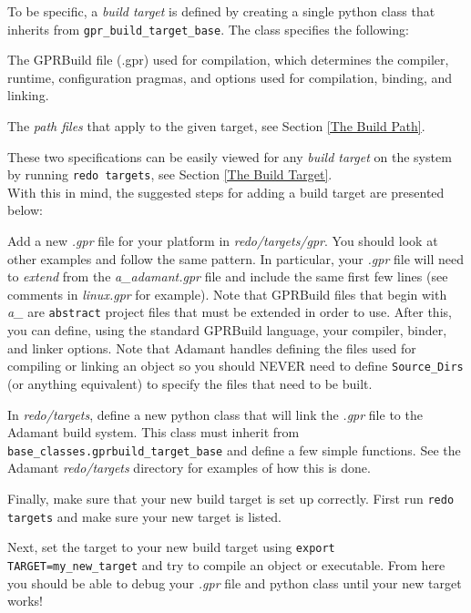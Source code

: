 To be specific, a \textit{build target} is defined by creating a single python class that inherits from \texttt{gpr\_build\_target\_base}. The class specifies the following:

\vspace{5mm} %
\begin{spacedenumerate}
  \item The GPRBuild file (.gpr) used for compilation, which determines the compiler, runtime, configuration pragmas, and options used for compilation, binding, and linking.
  \item The \textit{path files} that apply to the given target, see Section \ref{The Build Path}.
\end{spacedenumerate}
\vspace{5mm} %

These two specifications can be easily viewed for any \textit{build target} on the system by running \texttt{redo targets}, see Section \ref{The Build Target}. \\

With this in mind, the suggested steps for adding a build target are presented below:

\vspace{5mm} %
\begin{spacedenumerate}
  \item Add a new \textit{.gpr} file for your platform in \textit{redo/targets/gpr}. You should look at other examples and follow the same pattern. In particular, your \textit{.gpr} file will need to \textit{extend} from the \textit{a\_adamant.gpr} file and include the same first few lines (see comments in \textit{linux.gpr} for example). Note that GPRBuild files that begin with \textit{a\_} are \texttt{abstract} project files that must be extended in order to use. After this, you can define, using the standard GPRBuild language, your compiler, binder, and linker options. Note that Adamant handles defining the files used for compiling or linking an object so you should NEVER need to define \texttt{Source\_Dirs} (or anything equivalent) to specify the files that need to be built.
  \item In \textit{redo/targets}, define a new python class that will link the \textit{.gpr} file to the Adamant build system. This class must inherit from \texttt{base\_classes.gprbuild\_target\_base} and define a few simple functions. See the Adamant \textit{redo/targets} directory for examples of how this is done.
  \item Finally, make sure that your new build target is set up correctly. First run \texttt{redo targets} and make sure your new target is listed. 
  \item Next, set the target to your new build target using \texttt{export TARGET=my\_new\_target} and try to compile an object or executable. From here you should be able to debug your \textit{.gpr} file and python class until your new target works!
\end{spacedenumerate}
\vspace{5mm} %

